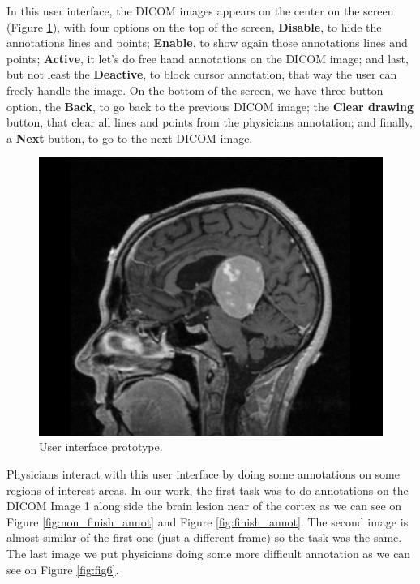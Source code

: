 \documentclass{sigchi}
\begin{document}
In this user interface, the DICOM images appears on the center on the screen (Figure \ref{fig:main_user_interface}), with four options on the top of the screen, \textbf{Disable}, to hide the annotations lines and points; \textbf{Enable}, to show again those annotations lines and points; \textbf{Active}, it let's do free hand annotations on the DICOM image; and last, but not least the \textbf{Deactive}, to block cursor annotation, that way the user can freely handle the image. On the bottom of the screen, we have three button option, the \textbf{Back}, to go back to the previous DICOM image; the \textbf{Clear drawing} button, that clear all lines and points from the physicians annotation; and finally, a \textbf{Next} button, to go to the next DICOM image.

\begin{figure}[!h]
\centering
\includegraphics[width=0.9\columnwidth]{screen1}
\caption{User interface prototype.}
\label{fig:main_user_interface}
\end{figure}

Physicians interact with this user interface by doing some annotations on some regions of interest areas. In our work, the first task was to do annotations on the DICOM Image 1 along side the brain lesion near of the cortex as we can see on Figure \ref{fig:non_finish_annot} and Figure \ref{fig:finish_annot}. The second image is almost similar of the first one (just a different frame) so the task was the same. The last image we put physicians doing some more difficult annotation as we can see on Figure \ref{fig:fig6}.
\end{document}
